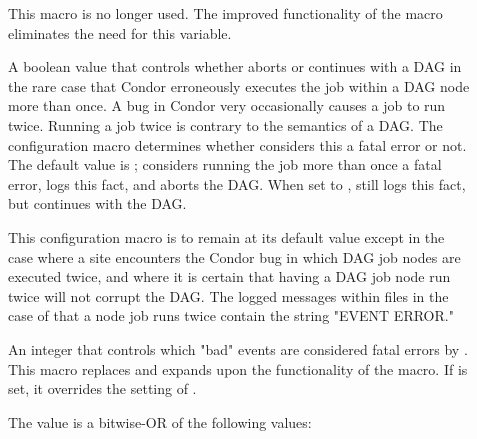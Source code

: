 \begin{description}

\item[]
\label{param:DAGManIgnoreDuplicateJobExecution}
This macro is no longer used. The improved functionality
of the  macro eliminates the
need for this variable.

A boolean value that controls
whether  aborts or continues with a DAG
in the rare case that Condor erroneously executes
the job within a DAG node more than once.
A bug in Condor very occasionally causes a job to run twice.
Running a job twice is contrary to the semantics of a DAG.
The configuration macro 
determines whether   considers this a fatal error or not.
The default value is ;  considers
running the job more than once a fatal error, 
logs this fact,
and aborts the DAG.
When set to ,  still
logs this fact,
but continues with the DAG. 

This configuration macro is to remain at its default value 
except in the case
where a site encounters the Condor bug in which DAG job nodes
are executed twice,
and where it is certain
that having a DAG job node run twice will not corrupt the DAG.
The logged messages within  files
in the case of that a node job runs twice
contain the string
"EVENT ERROR."

\item[]
\label{param:DAGManAllowEvents}
An integer that controls which "bad" events are considered
fatal errors by .  This macro replaces and expands
upon the functionality of the
 macro.
If  is set, it overrides the
setting of .

The  value is a bitwise-OR of the
following values:


\end{description}
